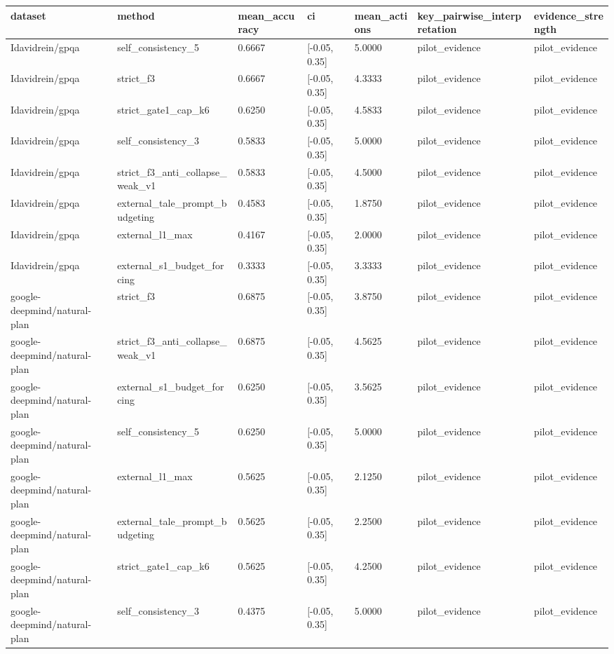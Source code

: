\begin{tabular}{lllllll}
\hline
dataset & method & mean\_accuracy & ci & mean\_actions & key\_pairwise\_interpretation & evidence\_strength \\
\hline
Idavidrein/gpqa & self\_consistency\_5 & 0.6667 & [-0.05, 0.35] & 5.0000 & pilot\_evidence & pilot\_evidence \\
Idavidrein/gpqa & strict\_f3 & 0.6667 & [-0.05, 0.35] & 4.3333 & pilot\_evidence & pilot\_evidence \\
Idavidrein/gpqa & strict\_gate1\_cap\_k6 & 0.6250 & [-0.05, 0.35] & 4.5833 & pilot\_evidence & pilot\_evidence \\
Idavidrein/gpqa & self\_consistency\_3 & 0.5833 & [-0.05, 0.35] & 5.0000 & pilot\_evidence & pilot\_evidence \\
Idavidrein/gpqa & strict\_f3\_anti\_collapse\_weak\_v1 & 0.5833 & [-0.05, 0.35] & 4.5000 & pilot\_evidence & pilot\_evidence \\
Idavidrein/gpqa & external\_tale\_prompt\_budgeting & 0.4583 & [-0.05, 0.35] & 1.8750 & pilot\_evidence & pilot\_evidence \\
Idavidrein/gpqa & external\_l1\_max & 0.4167 & [-0.05, 0.35] & 2.0000 & pilot\_evidence & pilot\_evidence \\
Idavidrein/gpqa & external\_s1\_budget\_forcing & 0.3333 & [-0.05, 0.35] & 3.3333 & pilot\_evidence & pilot\_evidence \\
google-deepmind/natural-plan & strict\_f3 & 0.6875 & [-0.05, 0.35] & 3.8750 & pilot\_evidence & pilot\_evidence \\
google-deepmind/natural-plan & strict\_f3\_anti\_collapse\_weak\_v1 & 0.6875 & [-0.05, 0.35] & 4.5625 & pilot\_evidence & pilot\_evidence \\
google-deepmind/natural-plan & external\_s1\_budget\_forcing & 0.6250 & [-0.05, 0.35] & 3.5625 & pilot\_evidence & pilot\_evidence \\
google-deepmind/natural-plan & self\_consistency\_5 & 0.6250 & [-0.05, 0.35] & 5.0000 & pilot\_evidence & pilot\_evidence \\
google-deepmind/natural-plan & external\_l1\_max & 0.5625 & [-0.05, 0.35] & 2.1250 & pilot\_evidence & pilot\_evidence \\
google-deepmind/natural-plan & external\_tale\_prompt\_budgeting & 0.5625 & [-0.05, 0.35] & 2.2500 & pilot\_evidence & pilot\_evidence \\
google-deepmind/natural-plan & strict\_gate1\_cap\_k6 & 0.5625 & [-0.05, 0.35] & 4.2500 & pilot\_evidence & pilot\_evidence \\
google-deepmind/natural-plan & self\_consistency\_3 & 0.4375 & [-0.05, 0.35] & 5.0000 & pilot\_evidence & pilot\_evidence \\
\hline
\end{tabular}
